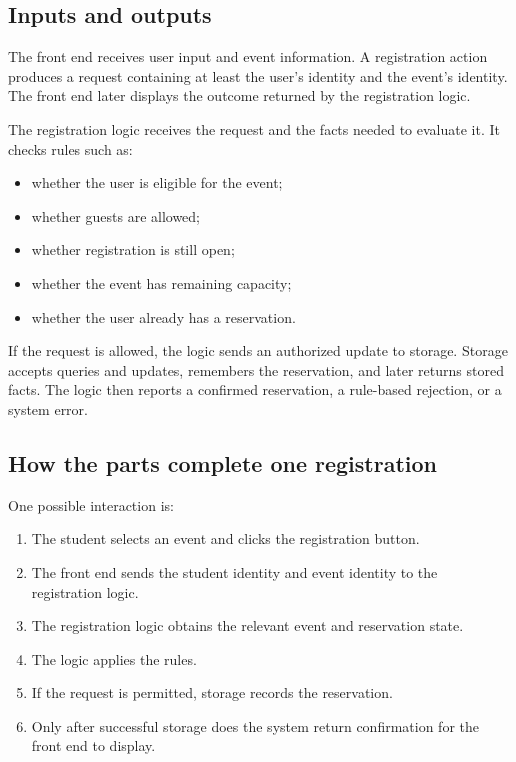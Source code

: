 \documentclass[11pt]{article}
\begin{document}
\subsection{Inputs and outputs}

The front end receives user input and event information. A registration action produces a request containing at least the user's identity and the event's identity. The front end later displays the outcome returned by the registration logic.

The registration logic receives the request and the facts needed to evaluate it. It checks rules such as:
\begin{itemize}
  \item whether the user is eligible for the event;
  \item whether guests are allowed;
  \item whether registration is still open;
  \item whether the event has remaining capacity;
  \item whether the user already has a reservation.
\end{itemize}

If the request is allowed, the logic sends an authorized update to storage. Storage accepts queries and updates, remembers the reservation, and later returns stored facts. The logic then reports a confirmed reservation, a rule-based rejection, or a system error.

\subsection{How the parts complete one registration}

One possible interaction is:
\begin{enumerate}
  \item The student selects an event and clicks the registration button.
  \item The front end sends the student identity and event identity to the registration logic.
  \item The registration logic obtains the relevant event and reservation state.
  \item The logic applies the rules.
  \item If the request is permitted, storage records the reservation.
  \item Only after successful storage does the system return confirmation for the front end to display.
\end{enumerate}
\end{document}

